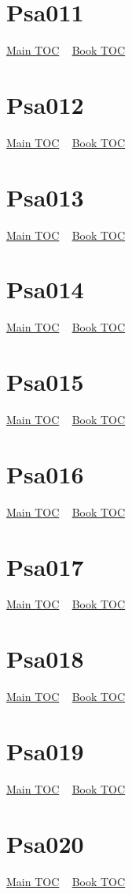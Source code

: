 \documentclass{book}
\begin{document}
  \section{Psa011}\hyperlink{toc}{Main TOC} ~ \hyperref[subsec:Psa]{Book TOC} 
  \section{Psa012}\hyperlink{toc}{Main TOC} ~ \hyperref[subsec:Psa]{Book TOC} 
  \section{Psa013}\hyperlink{toc}{Main TOC} ~ \hyperref[subsec:Psa]{Book TOC} 
  \section{Psa014}\hyperlink{toc}{Main TOC} ~ \hyperref[subsec:Psa]{Book TOC} 
  \section{Psa015}\hyperlink{toc}{Main TOC} ~ \hyperref[subsec:Psa]{Book TOC} 
  \section{Psa016}\hyperlink{toc}{Main TOC} ~ \hyperref[subsec:Psa]{Book TOC} 
  \section{Psa017}\hyperlink{toc}{Main TOC} ~ \hyperref[subsec:Psa]{Book TOC} 
  \section{Psa018}\hyperlink{toc}{Main TOC} ~ \hyperref[subsec:Psa]{Book TOC} 
  \section{Psa019}\hyperlink{toc}{Main TOC} ~ \hyperref[subsec:Psa]{Book TOC} 
  \section{Psa020}\hyperlink{toc}{Main TOC} ~ \hyperref[subsec:Psa]{Book TOC} 
\end{document}
